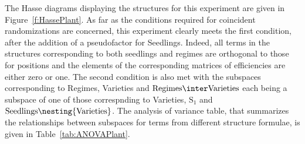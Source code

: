 The Hasse diagrams displaying the structures for this experiment are given 
in Figure~\ref{f:HassePlant}. As far as the conditions required for coincident 
randomizations are concerned, this experiment clearly meets the first condition, after the addition of a pseudofactor for Seedlings. Indeed, 
all terms in the structures corresponding to both seedlings and regimes 
are orthogonal to those for positions and the elements of the corresponding 
matrices of efficiencies are either zero or one. 
The second condition is also met with the subspaces corresponding to 
Regimes, Varieties and $\mbox{Regimes} \inter \mbox{Varieties}$ each being 
a subspace of one of those correspnding to Varieties, $\mbox{S}_1$ and 
$\mbox{Seedlings} \nesting{\mbox{Varieties}}$.
The analysis of variance table, that summarizes the relationships 
between subspaces for terms from different structure formulae, 
is given in Table~\ref{tab:ANOVAPlant}.

